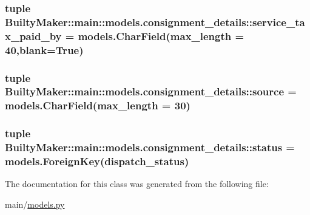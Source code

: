 \hypertarget{classBuiltyMaker_1_1main_1_1models_1_1consignment__details_afe8f2f7e5eea040ed543b42bb9c58d3b}{
\subsubsection[{service\-\_\-tax\-\_\-paid\-\_\-by}]{\setlength{\rightskip}{0pt plus 5cm}tuple {\bf \-Builty\-Maker\-::main\-::models.\-consignment\-\_\-details\-::service\-\_\-tax\-\_\-paid\-\_\-by} = models.\-Char\-Field(max\-\_\-length = 40,blank=\-True)}}\label{classBuiltyMaker_1_1main_1_1models_1_1consignment__details_afe8f2f7e5eea040ed543b42bb9c58d3b}
\hypertarget{classBuiltyMaker_1_1main_1_1models_1_1consignment__details_a7b75b8a9f2cf74bc0e4f1e07c6b9307b}{
\subsubsection[{source}]{\setlength{\rightskip}{0pt plus 5cm}tuple {\bf \-Builty\-Maker\-::main\-::models.\-consignment\-\_\-details\-::source} = models.\-Char\-Field(max\-\_\-length = 30)}}\label{classBuiltyMaker_1_1main_1_1models_1_1consignment__details_a7b75b8a9f2cf74bc0e4f1e07c6b9307b}
\hypertarget{classBuiltyMaker_1_1main_1_1models_1_1consignment__details_a98af015be664e6ee397ac2dcf44cee37}{
\subsubsection[{status}]{\setlength{\rightskip}{0pt plus 5cm}tuple {\bf \-Builty\-Maker\-::main\-::models.\-consignment\-\_\-details\-::status} = models.\-Foreign\-Key({\bf dispatch\-\_\-status})}}\label{classBuiltyMaker_1_1main_1_1models_1_1consignment__details_a98af015be664e6ee397ac2dcf44cee37}


\-The documentation for this class was generated from the following file\-:\begin{DoxyCompactItemize}
\item 
main/\hyperlink{models_8py}{models.\-py}\end{DoxyCompactItemize}
